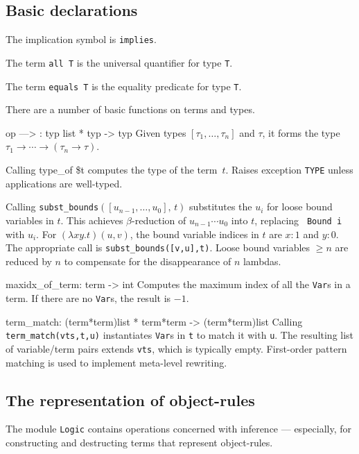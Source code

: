 


\subsection{Basic declarations}
The implication symbol is {\tt implies}.

The term \verb|all T| is the universal quantifier for type {\tt T}\@.

The term \verb|equals T| is the equality predicate for type {\tt T}\@.


There are a number of basic functions on terms and types.

\index{--->}
\beginprog
op ---> : typ list * typ -> typ
\endprog
Given types \([ \tau_1, \ldots, \tau_n]\) and \(\tau\), it
forms the type \(\tau_1\to \cdots \to (\tau_n\to\tau)\).

Calling {\prog{}type_of \${t}} computes the type of the
term~$t$.  Raises exception {\tt TYPE} unless applications are well-typed.


Calling \verb|subst_bounds|$([u_{n-1},\ldots,u_0],\,t)$
substitutes the $u_i$ for loose bound variables in $t$.  This achieves
\(\beta\)-reduction of \(u_{n-1} \cdots u_0\) into $t$, replacing {\tt
Bound~i} with $u_i$.  For \((\lambda x y.t)(u,v)\), the bound variable
indices in $t$ are $x:1$ and $y:0$.  The appropriate call is
\verb|subst_bounds([v,u],t)|.  Loose bound variables $\geq n$ are reduced
by $n$ to compensate for the disappearance of $n$ lambdas.

\beginprog
maxidx_of_term: term -> int
\endprog
Computes the maximum index of all the {\tt Var}s in a term.
If there are no {\tt Var}s, the result is \(-1\).

\beginprog
term_match: (term*term)list * term*term -> (term*term)list
\endprog
Calling \verb|term_match(vts,t,u)| instantiates {\tt Var}s in {\tt t} to
match it with {\tt u}.  The resulting list of variable/term pairs extends
{\tt vts}, which is typically empty.  First-order pattern matching is used
to implement meta-level rewriting.


\subsection{The representation of object-rules}
The module {\tt Logic} contains operations concerned with inference ---
especially, for constructing and destructing terms that represent
object-rules.

